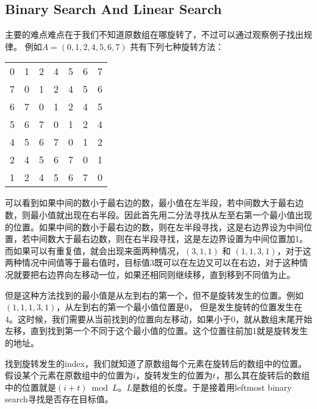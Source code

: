 \subsection{Binary Search And Linear Search}
\begin{CJK*}{UTF8}{gbsn}
主要的难点难点在于我们不知道原数组在哪旋转了，不过可以通过观察例子找出规律。 例如$A=(0, 1, 2, 4, 5, 6, 7)$ 共有下列七种旋转方法：

\begin{table}[H]
\begin{tabular}{lllllll}
0 & 1 & 2 & {\color{red} 4} & 5 & 6 & 7 \\
7 & 0 & 1 & {\color{red} 2} & 4 & 5 & 6 \\
6 & 7 & 0 & {\color{red} 1} & 2 & 4 & 5 \\
5 & 6 & 7 & {\color{red} 0} & 1 & 2 & 4 \\
4 & 5 & 6 & {\color{red} 7} & 0 & 1 & 2 \\
2 & 4 & 5 & {\color{red} 6} & 7 & 0 & 1 \\
1 & 2 & 4 & {\color{red} 5} & 6 & 7 & 0
\end{tabular}
\end{table}
可以看到如果中间的数小于最右边的数，最小值在左半段，若中间数大于最右边数，则最小值就出现在右半段。因此首先用二分法寻找从左至右第一个最小值出现的位置。如果中间的数小于最右边的数，则在左半段寻找，这是右边界设为中间位置，若中间数大于最右边数，则在右半段寻找，这是左边界设置为中间位置加1。而如果可以有重复值，就会出现来面两种情况，$(3, 1, 1)$ 和 $(1,1,3,1)$，对于这两种情况中间值等于最右值时，目标值3既可以在左边又可以在右边，对于这种情况就要把右边界向左移动一位，如果还相同则继续移，直到移到不同值为止。
\par
但是这种方法找到的最小值是从左到右的第一个，但不是旋转发生的位置。例如$(1,1,1,3,1)$，从左到右的第一个最小值位置是0， 但是发生旋转的位置发生在4。这时候，我们需要从当前找到的位置向左移动，如果小于0，就从数组末尾开始左移，直到找到第一个不同于这个最小值的位置。这个位置往前加1就是旋转发生的地址。
\par
找到旋转发生的index，我们就知道了原数组每个元素在旋转后的数组中的位置。假设某个元素在原数组中的位置为$i$，旋转发生的位置为$t$，那么其在旋转后的数组中的位置就是$(i+t)\bmod L$。$L$是数组的长度。于是接着用leftmost binary search寻找是否存在目标值。
\end{CJK*}
